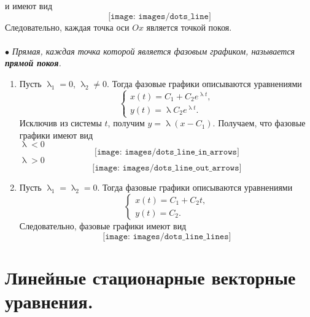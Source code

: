\documentclass[a4paper, 12pt]{report}
\renewcommand{\lambda}{\uplambda}
\begin{document}
и имеют вид
$$\texttt{[image: images/dots\_line]}$$
Следовательно, каждая точка оси $Ox$ является точкой покоя.\\\\
$\bullet$ \textit{Прямая, каждая точка которой является фазовым графиком, называется \textbf{прямой покоя}.}
\begin{enumerate}
	\item Пусть $\lambda_1 = 0$, $\lambda_2 \ne 0$. Тогда фазовые графики описываются уравнениями
	$$\begin{cases}
		x(t) = C_1 + C_2e^{\lambda t},\\
		y(t) = \lambda C_2e^{\lambda t}.
	\end{cases}$$
Исключив из системы $t$, получим $y = \lambda(x - C_1)$. Получаем, что фазовые графики имеют вид\\
$\lambda < 0$
$$\texttt{[image: images/dots\_line\_in\_arrows]}$$
$\lambda > 0$
$$\texttt{[image: images/dots\_line\_out\_arrows]}$$
\item Пусть $\lambda_1 = \lambda_2 = 0$. Тогда фазовые графики описываются уравнениями
$$\begin{cases}
	x(t) = C_1 + C_2t,\\
	y(t) = C_2.
\end{cases}$$
Следовательно, фазовые графики имеют вид
$$\texttt{[image: images/dots\_line\_lines]}$$
\end{enumerate}
\chapter{Линейные стационарные векторные уравнения.}
\end{document}
